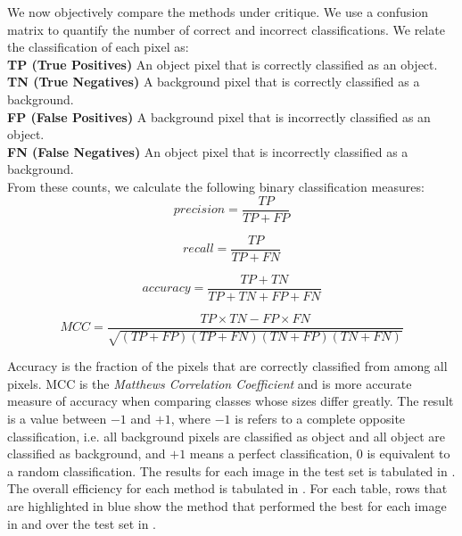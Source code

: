 \begin{definition}
	We now objectively compare the methods under critique. We use a confusion matrix to quantify the number of correct and incorrect classifications. We relate the classification of each pixel as:\\
	\textbf{TP (True Positives)} An object pixel that is correctly classified as an object.\\
	\textbf{TN (True Negatives)} A background pixel that is correctly classified as a background.\\
	\textbf{FP (False Positives)} A background pixel that is incorrectly classified as an object.\\
	\textbf{FN (False Negatives)} An object pixel that is incorrectly classified as a background.\\

	From these counts, we calculate the following binary classification measures:
	\begin{equation*}
		precision = \frac{TP}{TP+FP}
	\end{equation*}
	
	\begin{equation*}
		recall = \frac{TP}{TP+FN}
	\end{equation*}
	
	\begin{equation*}
		accuracy = \frac{TP+TN}{TP+TN+FP+FN}
	\end{equation*}
	
	\begin{equation*}
		MCC = \frac{TP \times TN - FP \times FN}{\sqrt{\left( TP + FP \right) \left( TP + FN \right) \left( TN + FP \right) \left( TN + FN \right)}}
	\end{equation*}
\end{definition}

Accuracy is the fraction of the pixels that are correctly classified from among all pixels. MCC is the \textit{Matthews Correlation Coefficient} and is more accurate measure of accuracy when comparing classes whose sizes differ greatly. The result is a value between $-1$ and $+1$, where $-1$ is refers to a complete opposite classification, i.e. all background pixels are classified as object and all object are classified as background, and $+1$ means a perfect classification, $0$ is equivalent to a random classification. The results for each image in the test set is tabulated in . The overall efficiency for each method is tabulated in . For each table, rows that are highlighted in blue show the method that performed the best for each image in  and over the test set in .

